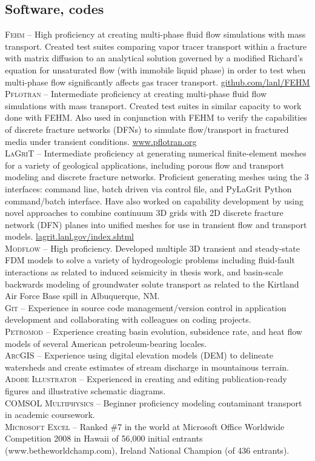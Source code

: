 \documentclass[11pt, letterpaper]{article}
\begin{document}
\subsection*{Software, codes}
\noindent
\textsc{Fehm} – High proficiency at creating multi-phase fluid flow simulations with mass transport. Created test suites comparing vapor tracer transport within a fracture with matrix diffusion to an analytical solution governed by a modified Richard’s equation for unsaturated flow (with immobile liquid phase) in order to test when multi-phase flow significantly affects gas tracer transport. \href{https://github.com/lanl/FEHM}{github.com/lanl/FEHM} \\[5pt]
\textsc{Pflotran} – Intermediate proficiency at creating multi-phase fluid flow simulations with mass transport. Created test suites in similar capacity to work done with FEHM. Also used in conjunction with FEHM to verify the capabilities of discrete fracture networks (DFNs) to simulate flow/transport in fractured media under transient conditions. \href{https://www.pflotran.org}{www.pflotran.org} \\[5pt]
\textsc{LaGriT} – Intermediate proficiency at generating numerical finite-element meshes for a variety of geological applications, including porous flow and transport modeling and discrete fracture networks. Proficient generating meshes using the 3 interfaces: command line, batch driven via control file, and PyLaGrit Python command/batch interface. Have also worked on capability development by using novel approaches to combine continuum 3D grids with 2D discrete fracture network (DFN) planes into unified meshes for use in transient flow and transport models. \href{https://lagrit.lanl.gov/index.shtml}{lagrit.lanl.gov/index.shtml} \\[5pt]
\textsc{Modflow} – High proficiency. Developed multiple 3D transient and steady-state FDM models to solve a variety of hydrogeologic problems including fluid-fault interactions as related to induced seismicity in thesis work, and basin-scale backwards modeling of groundwater solute transport as related to the Kirtland Air Force Base spill in Albuquerque, NM.\\[5pt]
\textsc{Git} – Experience in source code management/version control in application development and collaborating with colleagues on coding projects.\\[5pt]
\textsc{Petromod} – Experience creating basin evolution, subsidence rate, and heat flow models of several American petroleum-bearing locales.\\[5pt] 
\textsc{ArcGIS} – Experience using digital elevation models (DEM) to delineate watersheds and create estimates of stream discharge in mountainous terrain.\\[5pt] 
\textsc{Adobe Illustrator} – Experienced in creating and editing publication-ready figures and illustrative schematic diagrams.\\[5pt] 
\textsc{COMSOL Multiphysics} – Beginner proficiency modeling contaminant transport in academic coursework.\\[5pt] 
\textsc{Microsoft Excel} – Ranked \#7 in the world at Microsoft Office Worldwide Competition 2008 in Hawaii of 56,000 initial entrants (www.betheworldchamp.com), Ireland National Champion (of 436 entrants).
\end{document}

